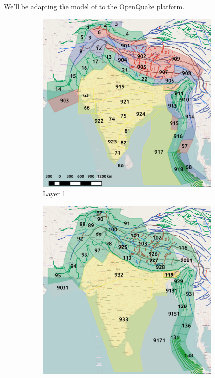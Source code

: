 \documentclass{article}
\begin{document}
We'll be adapting the model of \cite{nath2012probabilistic} to the OpenQuake platform.
\begin{figure}
    \centering
    \begin{subfigure}[b]{0.48\textwidth}
        \includegraphics[width=\textwidth]{India_Areal_Layer_1.png}
        \caption[]{Layer 1}
        \label{fig:ArealLayer1}
    \end{subfigure}
    \begin{subfigure}[b]{0.48\textwidth}  
        \includegraphics[width=\textwidth]{India_Areal_Layer_2.png}

\end{subfigure}
\end{figure}
\end{document}
